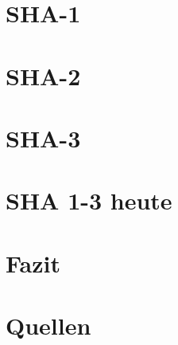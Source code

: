 \documentclass{article}
\begin{document}
	\section{SHA-1}
	\section{SHA-2}
	\section{SHA-3}
	\section{SHA 1-3 heute}
	\section{Fazit}
	\section{Quellen}
\end{document}
